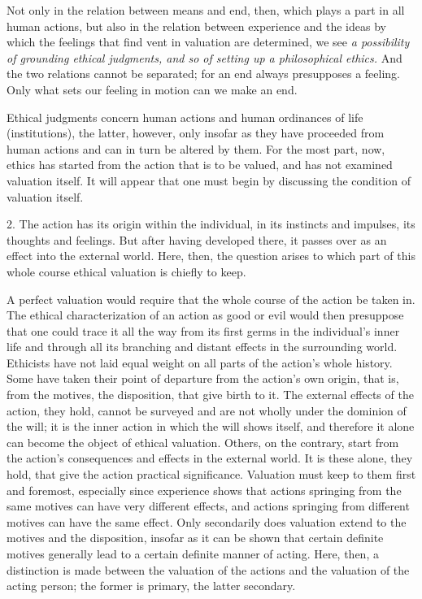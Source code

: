 \documentclass[12pt,a4paper,openany]{book}
\newcommand{\opage}[1]{\marginnote{\footnotesize\textit{[#1]}}}
\begin{document}
Not only in the relation between means and end, then, which plays a part in all human actions, but
also in the relation between experience and the ideas by which the feelings that find vent in
valuation are determined, we see \textit{a possibility of grounding ethical judgments, and so of
setting up a philosophical ethics.} And the two relations cannot be separated; for an end always
presupposes a feeling. Only what sets our feeling in motion can we make an end.

Ethical judgments concern human actions and human ordinances of life (institutions), the latter,
however, only insofar as they have proceeded from human actions and can in turn be altered by them.
For the most part, now, ethics has started from the action that is to be valued, and has not
examined valuation itself. It will appear that one must begin by discussing the condition of
valuation itself.

2. The action has its origin within the individual, in its instincts and impulses, its thoughts and
feelings. But after having developed there, it passes over as an effect into the external world.
Here, then, the question arises to which part of this whole course ethical valuation is chiefly to
keep.

A perfect valuation would require that the whole course of the action be taken in. The ethical
characterization of an action as good or evil would then presuppose that one could trace it all the
way from its first germs in the individual's inner life and through all its branching and distant
effects in the surrounding world. Ethicists have not laid equal weight on all parts of the action's
whole history. Some have taken their point of departure from the action's own origin, that is, from
the motives, the disposition, that give birth to it. The external effects of the action, they hold,
cannot be surveyed and are not wholly under the dominion of the will; it is the inner action in
which the will shows itself, and therefore it alone can
\opage{26}become the object of ethical valuation. Others, on the contrary, start from the action's
consequences and effects in the external world. It is these alone, they hold, that give the action
practical significance. Valuation must keep to them first and foremost, especially since experience
shows that actions springing from the same motives can have very different effects, and actions
springing from different motives can have the same effect. Only secondarily does valuation extend
to the motives and the disposition, insofar as it can be shown that certain definite motives
generally lead to a certain definite manner of acting. Here, then, a distinction is made between
the valuation of the actions and the valuation of the acting person; the former is primary, the
latter secondary.
\end{document}
